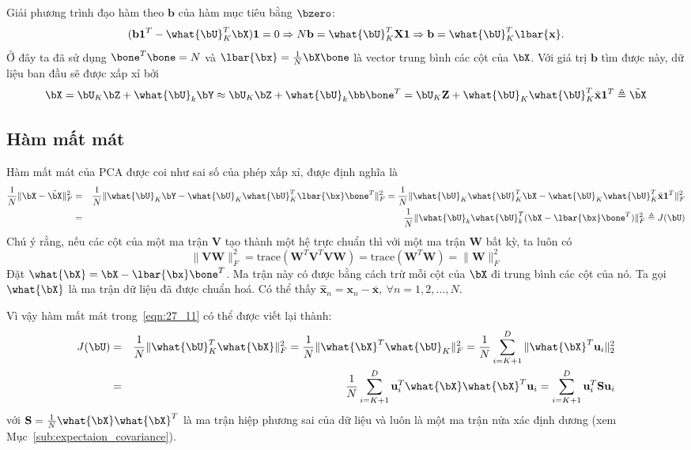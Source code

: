 Giải phương trình đạo hàm theo $\mathbf{b}$ của hàm mục tiêu bằng $\bzero$: 
\begin{equation} 
    (\mathbf{b1}^T - \what{\bU}_K^T\bX)\mathbf{1} = 0 \Rightarrow N\mathbf{b} = \what{\bU}_K^T \mathbf{X1} \Rightarrow \mathbf{b} = \what{\bU}_K^T \lbar{\mathbf{x}}.
\end{equation} 
Ở đây ta đã sử dụng $\bone^T\bone = N$ và $\lbar{\bx} = \frac{1}{N}\bX\bone$ là
vector trung bình các cột của $\bX$. 
Với giá trị $\mathbf{b}$ tìm được này, dữ liệu ban đầu sẽ được xấp xỉ bởi
\begin{equation} 
\label{eqn:27_10}
\bX = \bU_K \bZ + \what{\bU}_k\bY \approx \bU_K\bZ + \what{\bU}_k \bb\bone^T
= \bU_K \mathbf{Z} + \what{\bU}_K \what{\bU}_K^T\bar{\mathbf{x}}\mathbf{1}^T
\triangleq \tilde{\bX}
\end{equation} 
\subsection{Hàm mất mát}
Hàm mất mát của PCA được coi như sai số của phép xấp xỉ, được định
nghĩa là 
\begin{eqnarray}
\nonumber
\frac{1}{N}\|\bX - \tilde{\bX}\|_F^2 &=& 
\frac{1}{N}\|\what{\bU}_K \bY-  \what{\bU}_K
\what{\bU}_K^T\lbar{\bx}\bone^T\|_F^2 = 
\frac{1}{N}\|\what{\bU}_K \what{\bU}_K^T \bX -  \what{\bU}_K
\what{\bU}_K^T \bar{\mathbf{x}}\mathbf{1}^T\|_F^2\\
\label{eqn:27_11}
&=& \frac{1}{N} \|\what{\bU}_k \what{\bU}_k^T(\bX - \lbar{\bx}\bone^T)\|_F^2
\triangleq J(\bU)
\end{eqnarray}
Chú ý rằng, nếu các cột của một ma trận $\mathbf{V}$ tạo thành một hệ
trực chuẩn thì với một ma trận $\mathbf{W}$ bất kỳ, ta luôn có
\begin{equation} 
    \|\mathbf{VW}\|_F^2 = \text{trace} (\mathbf{W}^T\mathbf{V}^T\mathbf{V} \mathbf{W}) = \text{trace}(\mathbf{W}^T\mathbf{W}) = \|\mathbf{W}\|_F^2 
\end{equation} 
Đặt $\what{\bX} = \bX - \lbar{\bx}\bone^T$. Ma trận này có được bằng cách trừ
mỗi cột của $\bX$ đi trung bình các cột của nó. Ta gọi $\what{\bX}$ là {ma trận dữ liệu đã
được chuẩn hoá}. Có thể thấy $\hat{\mathbf{x}}_n = \mathbf{x}_n -
\bar{\mathbf{x}},~\forall n = 1, 2, \dots, N$.


Vì vậy hàm mất mát trong~\eqref{eqn:27_11} có thể được viết lại thành: 
\begin{eqnarray} 
    J(\bU) &=&  \frac{1}{N} \|\what{\bU}_K^T\what{\bX} \|_F^2 = \frac{1}{N}
    \|\what{\bX}^T \what{\bU}_K \|_F^2 = 
    \frac{1}{N}\sum_{i = K+1}^D \|\what{\bX}^T\mathbf{u}_i \|_2^2 \\\ 
    \label{eqn:27_12}
    &=& \frac{1}{N} \sum_{i=K+1}^D \mathbf{u}_i^T\what{\bX}\what{\bX}^T \mathbf{u}_i 
    = \sum_{i=K+1}^D \mathbf{u}_i^T\mathbf{S} \mathbf{u}_i
\end{eqnarray} 
với $\mathbf{S} = \frac{1}{N}\what{\bX}\what{\bX}^T$ là ma trận hiệp phương sai
của dữ liệu và luôn là một ma trận nửa xác định dương (xem
Mục~\ref{sub:expectaion_covariance}).
 
